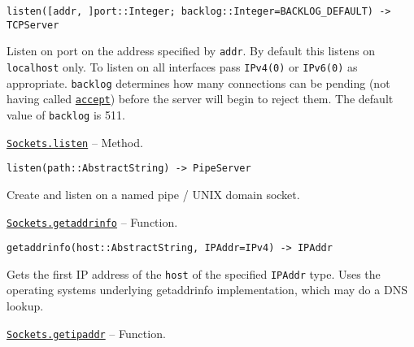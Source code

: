 \begin{adjustwidth}{2em}{0pt}


\begin{verbatim}
listen([addr, ]port::Integer; backlog::Integer=BACKLOG_DEFAULT) -> TCPServer
\end{verbatim}

Listen on port on the address specified by \texttt{addr}. By default this listens on \texttt{localhost} only. To listen on all interfaces pass \texttt{IPv4(0)} or \texttt{IPv6(0)} as appropriate. \texttt{backlog} determines how many connections can be pending (not having called \hyperlink{1426793569216032849}{\texttt{accept}}) before the server will begin to reject them. The default value of \texttt{backlog} is 511.



\end{adjustwidth}
\hypertarget{10346115046291513570}{}
\hyperlink{10346115046291513570}{\texttt{Sockets.listen}}  -- {Method.}

\begin{adjustwidth}{2em}{0pt}


\begin{verbatim}
listen(path::AbstractString) -> PipeServer
\end{verbatim}

Create and listen on a named pipe / UNIX domain socket.



\end{adjustwidth}
\hypertarget{10301989504197190983}{}
\hyperlink{10301989504197190983}{\texttt{Sockets.getaddrinfo}}  -- {Function.}

\begin{adjustwidth}{2em}{0pt}


\begin{verbatim}
getaddrinfo(host::AbstractString, IPAddr=IPv4) -> IPAddr
\end{verbatim}

Gets the first IP address of the \texttt{host} of the specified \texttt{IPAddr} type. Uses the operating system{\textquotesingle}s underlying getaddrinfo implementation, which may do a DNS lookup.



\end{adjustwidth}
\hypertarget{11265435361532665287}{}
\hyperlink{11265435361532665287}{\texttt{Sockets.getipaddr}}  -- {Function.}

